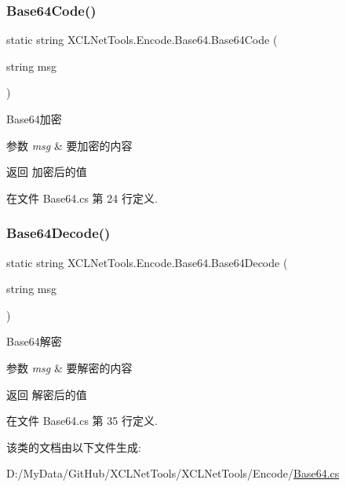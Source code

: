 \subsubsection{\texorpdfstring{Base64\+Code()}{Base64Code()}}
{\footnotesize\ttfamily static string X\+C\+L\+Net\+Tools.\+Encode.\+Base64.\+Base64\+Code (\begin{DoxyParamCaption}\item[{string}]{msg }\end{DoxyParamCaption})\hspace{0.3cm}{\ttfamily [static]}}



Base64加密 


\begin{DoxyParams}{参数}
{\em msg} & 要加密的内容\\
\hline
\end{DoxyParams}
\begin{DoxyReturn}{返回}
加密后的值
\end{DoxyReturn}


在文件 Base64.\+cs 第 24 行定义.

\mbox{\label{class_x_c_l_net_tools_1_1_encode_1_1_base64_af51bea13594029540c9e9abf3ce1bfb2}} 
\subsubsection{\texorpdfstring{Base64\+Decode()}{Base64Decode()}}
{\footnotesize\ttfamily static string X\+C\+L\+Net\+Tools.\+Encode.\+Base64.\+Base64\+Decode (\begin{DoxyParamCaption}\item[{string}]{msg }\end{DoxyParamCaption})\hspace{0.3cm}{\ttfamily [static]}}



Base64解密 


\begin{DoxyParams}{参数}
{\em msg} & 要解密的内容\\
\hline
\end{DoxyParams}
\begin{DoxyReturn}{返回}
解密后的值
\end{DoxyReturn}


在文件 Base64.\+cs 第 35 行定义.



该类的文档由以下文件生成\+:\begin{DoxyCompactItemize}
\item 
D\+:/\+My\+Data/\+Git\+Hub/\+X\+C\+L\+Net\+Tools/\+X\+C\+L\+Net\+Tools/\+Encode/\hyperlink{_base64_8cs}{Base64.\+cs}\end{DoxyCompactItemize}
